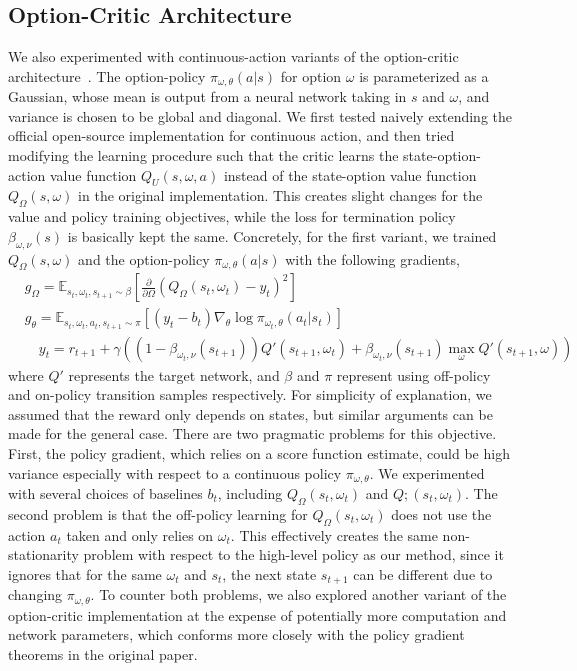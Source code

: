\documentclass{article}
\begin{document}
\subsection{Option-Critic Architecture}
We also experimented with continuous-action variants of the option-critic architecture~\cite{bacon2017option}. The option-policy $\pi_{\omega,\theta}(a|s)$ for option $\omega$ is parameterized as a Gaussian, whose mean is output from a neural network taking in $s$ and $\omega$, and variance is chosen to be global and diagonal. We first tested naively extending the official open-source implementation for continuous action, and then tried modifying the learning procedure such that the critic learns the state-option-action value function $Q_U(s,\omega,a)$ instead of the state-option value function $Q_\Omega(s,\omega)$ in the original implementation. This creates slight changes for the value and policy training objectives, while the loss for termination policy $\beta_{\omega,\nu}(s)$ is basically kept the same. Concretely, for the first variant, 
we trained $Q_\Omega(s,\omega)$ and the option-policy $\pi_{\omega,\theta}(a|s)$ with the following gradients,
\begin{align}
&g_{\Omega} = \mathbb{E}_{s_t,\omega_t,s_{t+1}\sim\beta}\left[\frac{\partial }{\partial \Omega}\left( Q_\Omega(s_t,\omega_t) - y_t \right)^2 \right] \\
&g_\theta = \mathbb{E}_{s_t,\omega_t,a_t,s_{t+1}\sim\pi} \left[ \left( y_t - b_t  \right)\nabla_\theta \log \pi_{\omega_t,\theta}(a_t|s_t) \right] \\
& \quad y_t = r_{t+1} + \gamma \left(\left(1-\beta_{\omega_t,\nu}(s_{t+1})\right)Q'(s_{t+1},\omega_t) + \beta_{\omega_t,\nu}(s_{t+1})\max_{\omega}Q'(s_{t+1},\omega)\right)
\end{align}
where $Q'$ represents the target network, and $\beta$ and $\pi$ represent using off-policy and on-policy transition samples respectively. For simplicity of explanation, we assumed that the reward only depends on states, but similar arguments can be made for the general case. There are two pragmatic problems for this objective. First, the policy gradient, which relies on a score function estimate, could be high variance especially with respect to a continuous policy $\pi_{\omega,\theta}$. We experimented with several choices of baselines $b_t$, including $Q_\Omega(s_t,\omega_t)$ and $Q;(s_t,\omega_t)$. The second problem is that the off-policy learning for $Q_\Omega(s_t,\omega_t)$ does not use the action $a_t$ taken and only relies on $\omega_t$. This effectively creates the same non-stationarity problem with respect to the high-level policy as our method, since it ignores that for the same $\omega_t$ and $s_t$, the next state $s_{t+1}$ can be different due to changing $\pi_{\omega,\theta}$. To counter both problems, we also explored another variant of the option-critic implementation at the expense of potentially more computation and network parameters, which conforms more closely with the policy gradient theorems in the original paper. 
\end{document}
